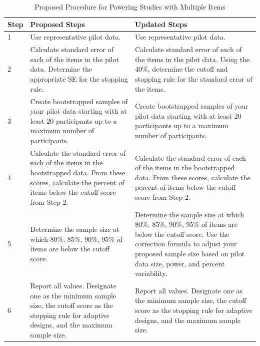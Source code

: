\documentclass[
  man]{apa7}
\begin{document}
\begin{table}[tbp]

\begin{center}
\begin{threeparttable}

\caption{\label{tab:table-summary}Proposed Procedure for Powering Studies with Multiple Items}

\footnotesize{

\begin{tabular}{m{1cm}m{6cm}m{6cm}}
\toprule
Step & Proposed Steps & Updated Steps\\
\midrule
1 & Use representative pilot data. & Use representative pilot data.\\
2 & Calculate standard error of each of the items in the pilot data. Determine the appropriate SE for the stopping rule. & Calculate standard error of each of the items in the pilot data. Using the 40\%, determine the cutoff and stopping rule for the standard error of the items.\\
3 & Create bootstrapped samples of your pilot data starting with at least 20 participants up to a maximum number of participants. & Create bootstrapped samples of your pilot data starting with at least 20 participants up to a maximum number of participants.\\
4 & Calculate the standard error of each of the items in the bootstrapped data. From these scores, calculate the percent of items below the cutoff score from Step 2. & Calculate the standard error of each of the items in the bootstrapped data. From these scores, calculate the percent of items below the cutoff score from Step 2.\\
5 & Determine the sample size at which 80\%, 85\%, 90\%, 95\% of items are below the cutoff score. & Determine the sample size at which 80\%, 85\%, 90\%, 95\% of items are below the cutoff score. Use the correction formula to adjust your proposed sample size based on pilot data size, power, and percent variability.\\
6 & Report all values. Designate one as the minimum sample size, the cutoff score as the stopping rule for adaptive designs, and the maximum sample size. & Report all values. Designate one as the minimum sample size, the cutoff score as the stopping rule for adaptive designs, and the maximum sample size.\\
\bottomrule
\end{tabular}

}

\end{threeparttable}
\end{center}

\end{table}
\end{document}
